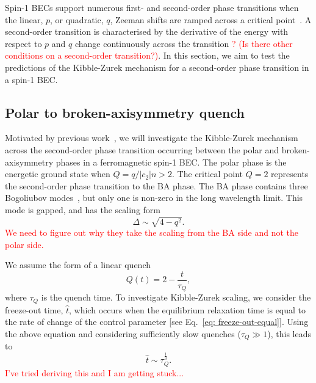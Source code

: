 Spin-1 BECs support numerous first- and second-order phase transitions
when the linear, $p$, or quadratic, $q$, Zeeman shifts are
ramped across a critical point~\cite{Kawaguchi2012}.
A second-order transition is characterised by the derivative of the energy with
respect to $p$ and $q$ change continuously across the transition
\textcolor{red}{? (Is there other conditions on a second-order transition?)}.
In this section, we aim to test the predictions of the Kibble-Zurek mechanism
for a second-order phase transition in a spin-1 BEC.

\subsection{Polar to broken-axisymmetry quench}
Motivated by previous work~\cite{Damski2007}, we will investigate the
Kibble-Zurek mechanism across the second-order phase transition occurring
between the polar and broken-axisymmetry phases in a ferromagnetic spin-1 BEC.
The polar phase is the energetic ground state when $Q=q/|c_2|n > 2$.
The critical point $Q=2$ represents the second-order phase transition to the
BA phase.
The BA phase contains three Bogoliubov modes~\cite{Uchino2010}, but only one
is non-zero in the long wavelength limit.
This mode is gapped, and has the scaling form
\begin{equation}
    \Delta \sim \sqrt{4 - q^2}.
\end{equation}
\textcolor{red}{We need to figure out why they take the scaling from the BA side
and not the polar side.}

We assume the form of a linear quench
\begin{equation}
    Q(t) = 2 - \frac{t}{\tau_Q},
    \label{eq: time-dep-Q-damski}
\end{equation}
where $\tau_Q$ is the quench time.
To investigate Kibble-Zurek scaling, we consider the freeze-out time, $\hat{t}$,
which occurs when the equilibrium relaxation time is equal to the rate of change
of the control parameter [see Eq.~\eqref{eq: freeze-out-equal}].
Using the above equation and considering sufficiently slow quenches
($\tau_Q \gg 1$), this leads to
\begin{equation}
    \hat{t} \sim \tau_Q^{\frac{1}{3}}.
\end{equation}
\textcolor{red}{I've tried deriving this and I am getting stuck...}

